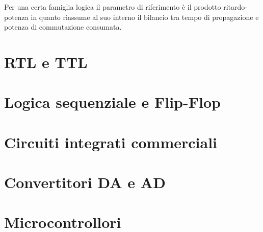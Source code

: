 \documentclass[12pt, a4paper]{report}
\begin{document}
Per una certa famiglia logica il parametro di riferimento è il prodotto ritardo-potenza in quanto riassume al suo interno il bilancio tra tempo di propagazione e potenza di commutazione consumata.

\chapter{RTL e TTL}


\chapter{Logica sequenziale e Flip-Flop}
\chapter{Circuiti integrati commerciali}
\chapter{Convertitori DA e AD}
\chapter{Microcontrollori}
\end{document}
